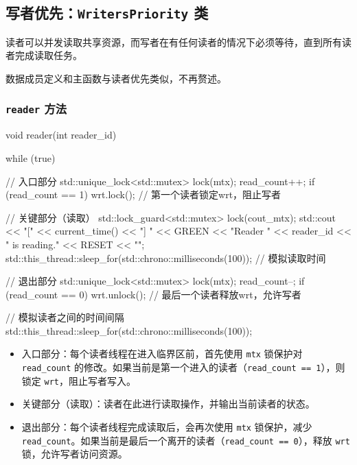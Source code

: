\subsection{写者优先：\texttt{WritersPriority} 类}

读者可以并发读取共享资源，而写者在有任何读者的情况下必须等待，直到所有读者完成读取任务。

数据成员定义和主函数与读者优先类似，不再赘述。

\subsubsection{\texttt{reader} 方法}
\begin{cppcode}
void reader(int reader_id)
{
    while (true) {
        // 入口部分
        {
            std::unique_lock<std::mutex> lock(mtx);
            read_count++;
            if (read_count == 1) {
                wrt.lock(); // 第一个读者锁定wrt，阻止写者
            }
        }

        // 关键部分（读取）
        {
            std::lock_guard<std::mutex> lock(cout_mtx);
            std::cout << "[" << current_time() << "] "
                      << GREEN << "Reader " << reader_id << " is reading." << RESET << "\n";
        }
        std::this_thread::sleep_for(std::chrono::milliseconds(100)); // 模拟读取时间

        // 退出部分
        {
            std::unique_lock<std::mutex> lock(mtx);
            read_count--;
            if (read_count == 0) {
                wrt.unlock(); // 最后一个读者释放wrt，允许写者
            }
        }

        // 模拟读者之间的时间间隔
        std::this_thread::sleep_for(std::chrono::milliseconds(100));
    }
}
\end{cppcode}
\begin{itemize}
    \item 入口部分：每个读者线程在进入临界区前，首先使用 \texttt{mtx} 锁保护对 \texttt{read\_count} 的修改。如果当前是第一个进入的读者（\texttt{read\_count == 1}），则锁定 \texttt{wrt}，阻止写者写入。
	\item 关键部分（读取）：读者在此进行读取操作，并输出当前读者的状态。
	\item 退出部分：每个读者线程完成读取后，会再次使用 \texttt{mtx} 锁保护，减少 \texttt{read\_count}。如果当前是最后一个离开的读者（\texttt{read\_count == 0}），释放 \texttt{wrt} 锁，允许写者访问资源。
\end{itemize}


